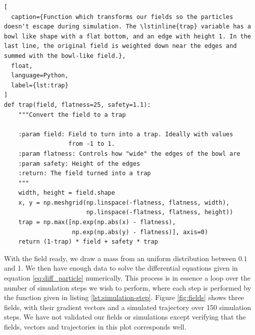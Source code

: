 \documentclass[a4paper]{article}
\begin{document}
\begin{lstlisting}[
  caption={Function which transforms our fields so the particles doesn't escape during simulation. The \lstinline{trap} variable has a bowl like shape with a flat bottom, and an edge with height 1. In the last line, the original field is weighted down near the edges and summed with the bowl-like field.},
  float,
  language=Python,
  label={lst:trap}
]
def trap(field, flatness=25, safety=1.1):
    """Convert the field to a trap

    :param field: Field to turn into a trap. Ideally with values
                  from -1 to 1.
    :param flatness: Controls how "wide" the edges of the bowl are
    :param safety: Height of the edges
    :return: The field turned into a trap
    """
    width, height = field.shape
    x, y = np.meshgrid(np.linspace(-flatness, flatness, width),
                       np.linspace(-flatness, flatness, height))
    trap = np.max([np.exp(np.abs(x) - flatness),
                   np.exp(np.abs(y) - flatness)], axis=0)
    return (1-trap) * field + safety * trap
\end{lstlisting}

With the field ready, we draw a mass from an uniform distribution between $0.1$ and 1. We then have enough data to solve the differential equations given in equation \ref{eq:diff_particle} numerically. This process is in essence a loop over the number of simulation steps we wish to perform, where each step is performed by the function given in listing \ref{lst:simulation-step}. Figure \ref{fig:fields} shows three fields, with their gradient vectors and a simulated trajectory over 150 simulation steps. We have not validated our fields or simulations except verifying that the fields, vectors and trajectories in this plot corresponds well. 
\end{document}
